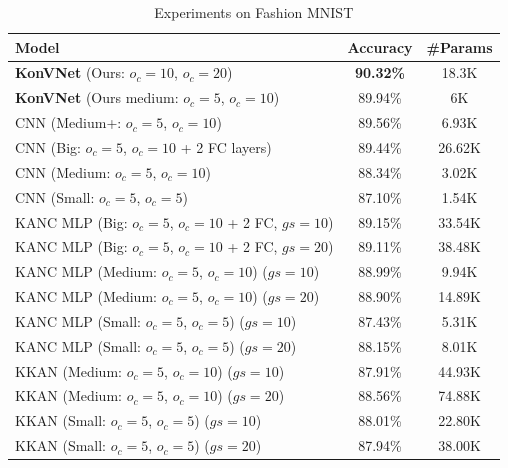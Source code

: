 \documentclass[conference]{IEEEtran}
\begin{document}
\begin{table}[h]
    \centering
    \begin{tabular}{l|c|c}
        \hline
        \textbf{Model}                                                & \textbf{Accuracy} & \textbf{\#Params} \\
        \hline
        \textbf{KonVNet} (Ours: \(o_c = 10\), \(o_c = 20\))           & \textbf{90.32\%}  & 18.3K             \\
        \textbf{KonVNet} (Ours medium: \(o_c = 5\), \(o_c = 10\))     & 89.94\%           & 6K                \\
        CNN (Medium+: \(o_c = 5\), \(o_c = 10\))                      & 89.56\%           & 6.93K             \\
        CNN (Big: \(o_c = 5\), \(o_c = 10\) + 2 FC layers)            & 89.44\%           & 26.62K            \\
        CNN (Medium: \(o_c = 5\), \(o_c = 10\))                       & 88.34\%           & 3.02K             \\
        CNN (Small: \(o_c = 5\), \(o_c = 5\))                         & 87.10\%           & 1.54K             \\
        KANC MLP (Big: \(o_c = 5\), \(o_c = 10\) + 2 FC, \(gs = 10\)) & 89.15\%           & 33.54K            \\
        KANC MLP (Big: \(o_c = 5\), \(o_c = 10\) + 2 FC, \(gs = 20\)) & 89.11\%           & 38.48K            \\
        KANC MLP (Medium: \(o_c = 5\), \(o_c = 10\)) (\(gs = 10\))    & 88.99\%           & 9.94K             \\
        KANC MLP (Medium: \(o_c = 5\), \(o_c = 10\)) (\(gs = 20\))    & 88.90\%           & 14.89K            \\
        KANC MLP (Small: \(o_c = 5\), \(o_c = 5\)) (\(gs = 10\))      & 87.43\%           & 5.31K             \\
        KANC MLP (Small: \(o_c = 5\), \(o_c = 5\)) (\(gs = 20\))      & 88.15\%           & 8.01K             \\
        KKAN (Medium: \(o_c = 5\), \(o_c = 10\)) (\(gs = 10\))        & 87.91\%           & 44.93K            \\
        KKAN (Medium: \(o_c = 5\), \(o_c = 10\)) (\(gs = 20\))        & 88.56\%           & 74.88K            \\
        KKAN (Small: \(o_c = 5\), \(o_c = 5\)) (\(gs = 10\))          & 88.01\%           & 22.80K            \\
        KKAN (Small: \(o_c = 5\), \(o_c = 5\)) (\(gs = 20\))          & 87.94\%           & 38.00K            \\
        \hline
    \end{tabular}
    \caption{Experiments on Fashion MNIST}
    \label{ressfashion}
\end{table}
\end{document}
